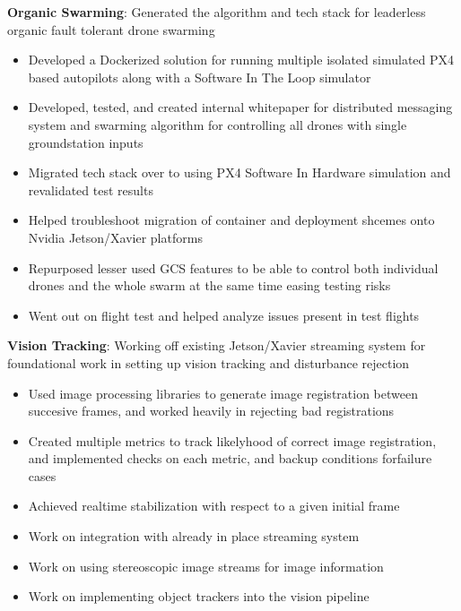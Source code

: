 \documentclass[letterpaper,10pt]{article}
\newcommand{\resumeItem}[2]{
  \item\small{
    \textbf{#1}{: #2 \vspace{-2pt}}
  }
}
\begin{document}
        \resumeItem{Organic Swarming} {Generated the algorithm and tech stack for leaderless organic fault tolerant drone swarming}
          \begin{itemize}
              \item Developed a Dockerized solution for running multiple isolated simulated PX4 based autopilots along with a Software In The Loop simulator
              \item Developed, tested, and created internal whitepaper for distributed messaging system and swarming algorithm for controlling all drones with single groundstation inputs
	   \item Migrated tech stack over to using PX4 Software In Hardware simulation and revalidated test results
	   \item Helped troubleshoot migration of container and deployment shcemes onto Nvidia Jetson/Xavier platforms
	   \item Repurposed lesser used GCS features to be able to control both individual drones and the whole swarm at the same time easing testing risks
	   \item Went out on flight test and helped analyze issues present in test flights 
              
          \end{itemize}
            
          
        \resumeItem{Vision Tracking} {Working off existing Jetson/Xavier streaming system for foundational work in setting up vision tracking and disturbance rejection}
          \begin{itemize}
              \item Used image processing libraries to generate image registration between succesive frames, and worked heavily in rejecting bad registrations
              \item Created multiple metrics to track likelyhood of correct image registration, and implemented checks on each metric, and backup conditions forfailure cases
	   \item Achieved realtime stabilization with respect to a given initial frame 
	   \item Work on integration with already in place streaming system
	   \item Work on using stereoscopic image streams for image information
	   \item Work on implementing object trackers into the vision pipeline
          \end{itemize}
          
\end{document}
